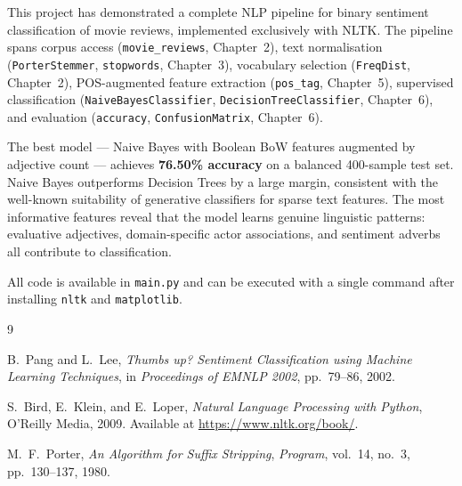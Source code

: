 \documentclass[11pt,a4paper]{article}
\begin{document}
This project has demonstrated a complete NLP pipeline for binary sentiment
classification of movie reviews, implemented exclusively with NLTK. The pipeline spans
corpus access (\texttt{movie\_reviews}, Chapter~2), text normalisation
(\texttt{PorterStemmer}, \texttt{stopwords}, Chapter~3), vocabulary selection
(\texttt{FreqDist}, Chapter~2), POS-augmented feature extraction (\texttt{pos\_tag},
Chapter~5), supervised classification (\texttt{NaiveBayesClassifier},
\texttt{DecisionTreeClassifier}, Chapter~6), and evaluation (\texttt{accuracy},
\texttt{ConfusionMatrix}, Chapter~6).

The best model --- Naive Bayes with Boolean BoW features augmented by adjective count
--- achieves \textbf{76.50\% accuracy} on a balanced 400-sample test set. Naive Bayes
outperforms Decision Trees by a large margin, consistent with the well-known suitability
of generative classifiers for sparse text features. The most informative features reveal
that the model learns genuine linguistic patterns: evaluative adjectives, domain-specific
actor associations, and sentiment adverbs all contribute to classification.

All code is available in \texttt{main.py} and can be executed with a single command
after installing \texttt{nltk} and \texttt{matplotlib}.

\begin{thebibliography}{9}

  B.~Pang and L.~Lee,
  \emph{Thumbs up? Sentiment Classification using Machine Learning Techniques},
  in \textit{Proceedings of EMNLP 2002}, pp.~79--86, 2002.

  S.~Bird, E.~Klein, and E.~Loper,
  \emph{Natural Language Processing with Python},
  O'Reilly Media, 2009.
  Available at \url{https://www.nltk.org/book/}.

  M.~F.~Porter,
  \emph{An Algorithm for Suffix Stripping},
  \textit{Program}, vol.~14, no.~3, pp.~130--137, 1980.

\end{thebibliography}
\end{document}
